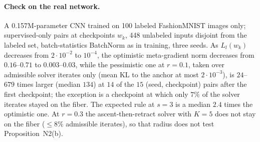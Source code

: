 \paragraph{Check on the real network.} A 0.157M-parameter CNN trained on 100 labeled
FashionMNIST images only; supervised-only pairs at checkpoints $w_k$, 448 unlabeled inputs
disjoint from the labeled set, batch-statistics BatchNorm as in training, three seeds. As
$L_l(w_k)$ decreases from $2\cdot10^{-2}$ to $10^{-4}$, the optimistic meta-gradient norm
decreases from $0.16$--$0.71$ to $0.003$--$0.03$, while the pessimistic one at $r=0.1$, taken
over admissible solver iterates only (mean KL to the anchor at most $2\cdot10^{-3}$), is
$24$--$679$ times larger (median $134$) at $14$ of the $15$ (seed, checkpoint) pairs after the
first checkpoint; the exception is a checkpoint at which only $7\%$ of the solver iterates
stayed on the fiber. The expected rule at $s=3$ is a median $2.4$ times the optimistic one.
At $r=0.3$ the ascent-then-retract solver with $K=5$ does not stay on the fiber ($\le8\%$
admissible iterates), so that radius does not test Proposition~N2(b).

